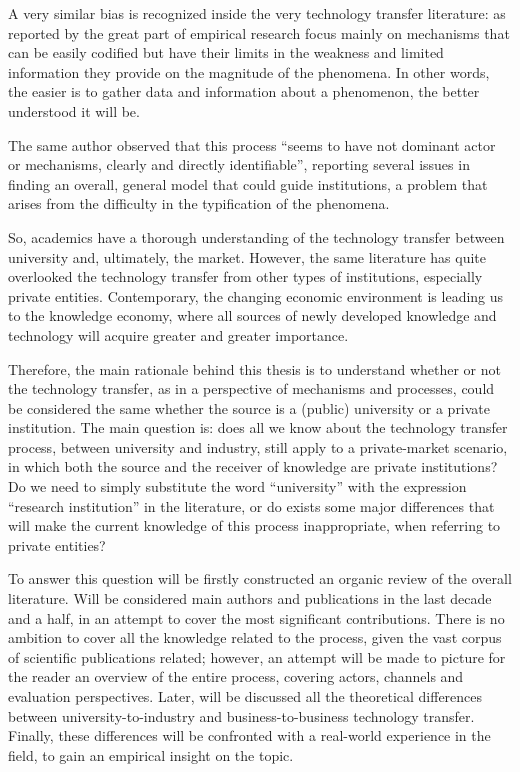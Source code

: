 A very similar bias is recognized inside the very technology transfer literature: as reported by \citet{Muscio2008} the great part of empirical research focus mainly on mechanisms that can be easily codified but have their limits in the weakness and limited information they provide on the magnitude of the phenomena. In other words, the easier is to gather data and information about a phenomenon, the better understood it will be. 

The same author observed that this process \enquote{seems to have not dominant actor or mechanisms, clearly and directly identifiable}, reporting several issues in finding an overall, general model that could guide institutions, a problem that arises from the difficulty in the typification of the phenomena.

So, academics have a thorough understanding of the technology transfer between university and, ultimately, the market. However, the same literature has quite overlooked the technology transfer from other types of institutions, especially private entities. Contemporary, the changing economic environment is leading us to the knowledge economy, where all sources of newly developed knowledge and technology will acquire greater and greater importance. 

Therefore, the main rationale behind this thesis is to understand whether or not the technology transfer, as in a perspective of mechanisms and processes, could be considered the same whether the source is a (public) university or a private institution. The main question is: does all we know about the technology transfer process, between university and industry, still apply to a private-market scenario, in which both the source and the receiver of knowledge are private institutions? Do we need to simply substitute the word \enquote{university} with the expression \enquote{research institution} in the literature, or do exists some major differences that will make the current knowledge of this process inappropriate, when referring to private entities?

To answer this question will be firstly constructed an organic review of the overall literature. Will be considered main authors and publications in the last decade and a half, in an attempt to cover the most significant contributions. There is no ambition to cover all the knowledge related to the process, given the vast corpus of scientific publications related; however, an attempt will be made to picture for the reader an overview of the entire process, covering actors, channels and evaluation perspectives. Later, will be discussed all the theoretical differences between university-to-industry and business-to-business technology transfer. Finally, these differences will be confronted with a real-world experience in the field, to gain an empirical insight on the topic.

